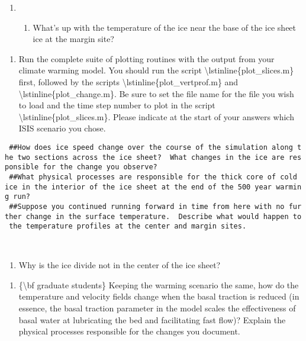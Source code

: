 \begin{enumerate}
\item
  \begin{enumerate}
  \itemsep1pt\parskip0pt
  \item
    What's up with the temperature of the ice near the base of the ice
    sheet ice at the margin site?
  \end{enumerate}
\end{enumerate}

\begin{enumerate}
\itemsep1pt\parskip0pt
\item
  Run the complete suite of plotting routines with the output from your
  climate warming model. You should run the script
  \textbackslash{}lstinline\{plot\_slices.m\} first, followed by the
  scripts \textbackslash{}lstinline\{plot\_vertprof.m\} and
  \textbackslash{}lstinline\{plot\_change.m\}. Be sure to set the file
  name for the file you wish to load and the time step number to plot in
  the script \textbackslash{}lstinline\{plot\_slices.m\}. Please
  indicate at the start of your answers which ISIS scenario you chose.
\end{enumerate}

\texttt{~\#\#How~does~ice~speed~change~over~the~course~of~the~simulation~along~the~two~sections~across~the~ice~sheet?~~What~changes~in~the~ice~are~responsible~for~the~change~you~observe?}\\\texttt{~\#\#What~physical~processes~are~responsible~for~the~thick~core~of~cold~ice~in~the~interior~of~the~ice~sheet~at~the~end~of~the~500~year~warming~run?}\\\texttt{~\#\#Suppose~you~continued~running~forward~in~time~from~here~with~no~further~change~in~the~surface~temperature.~~Describe~what~would~happen~to~the~temperature~profiles~at~the~center~and~margin~sites.}\\\texttt{~}\\\texttt{~}

\begin{enumerate}
\itemsep1pt\parskip0pt
\item
  Why is the ice divide not in the center of the ice sheet?
\end{enumerate}

\begin{enumerate}
\itemsep1pt\parskip0pt
\item
  \{\textbackslash{}bf graduate students\} Keeping the warming scenario
  the same, how do the temperature and velocity fields change when the
  basal traction is reduced (in essence, the basal traction parameter in
  the model scales the effectiveness of basal water at lubricating the
  bed and facilitating fast flow)? Explain the physical processes
  responsible for the changes you document.
\end{enumerate}

